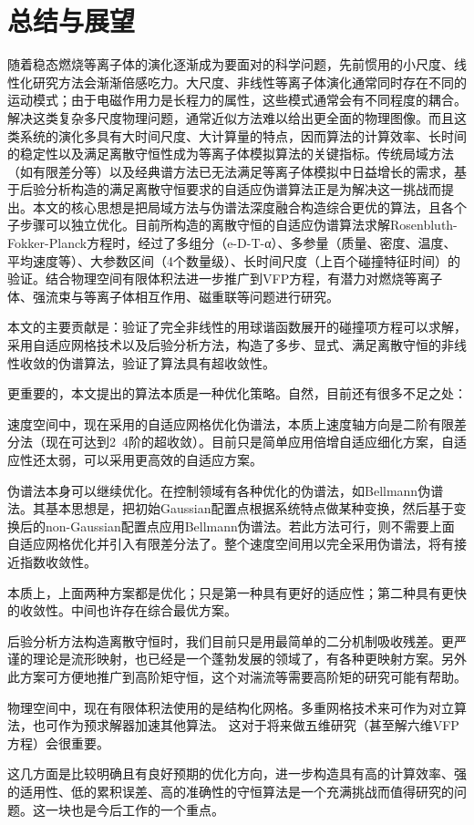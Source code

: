 \section{总结与展望}

随着稳态燃烧等离子体的演化逐渐成为要面对的科学问题，先前惯用的小尺度、线性化研究方法会渐渐倍感吃力。大尺度、非线性等离子体演化通常同时存在不同的运动模式；由于电磁作用力是长程力的属性，这些模式通常会有不同程度的耦合。解决这类复杂多尺度物理问题，通常近似方法难以给出更全面的物理图像。而且这类系统的演化多具有大时间尺度、大计算量的特点，因而算法的计算效率、长时间的稳定性以及满足离散守恒性成为等离子体模拟算法的关键指标。传统局域方法（如有限差分等）以及经典谱方法已无法满足等离子体模拟中日益增长的需求，基于后验分析构造的满足离散守恒要求的自适应伪谱算法正是为解决这一挑战而提出。本文的核心思想是把局域方法与伪谱法深度融合构造综合更优的算法，且各个子步骤可以独立优化。目前所构造的离散守恒的自适应伪谱算法求解Rosenbluth-Fokker-Planck方程时，经过了多组分（e-D-T-α）、多参量（质量、密度、温度、平均速度等）、大参数区间（4个数量级）、长时间尺度（上百个碰撞特征时间）的验证。结合物理空间有限体积法进一步推广到VFP方程，有潜力对燃烧等离子体、强流束与等离子体相互作用、磁重联等问题进行研究。

本文的主要贡献是：验证了完全非线性的用球谐函数展开的碰撞项方程可以求解，采用自适应网格技术以及后验分析方法，构造了多步、显式、满足离散守恒的非线性收敛的伪谱算法，验证了算法具有超收敛性。

更重要的，本文提出的算法本质是一种优化策略。自然，目前还有很多不足之处：

	速度空间中，现在采用的自适应网格优化伪谱法，本质上速度轴方向是二阶有限差分法（现在可达到2~4阶的超收敛）。目前只是简单应用倍增自适应细化方案，自适应性还太弱，可以采用更高效的自适应方案。
 
	伪谱法本身可以继续优化。在控制领域有各种优化的伪谱法，如Bellmann伪谱法。其基本思想是，把初始Gaussian配置点根据系统特点做某种变换，然后基于变换后的non-Gaussian配置点应用Bellmann伪谱法。若此方法可行，则不需要上面自适应网格优化并引入有限差分法了。整个速度空间用以完全采用伪谱法，将有接近指数收敛性。
 
本质上，上面两种方案都是优化；只是第一种具有更好的适应性；第二种具有更快的收敛性。中间也许存在综合最优方案。

	后验分析方法构造离散守恒时，我们目前只是用最简单的二分机制吸收残差。更严谨的理论是流形映射，也已经是一个蓬勃发展的领域了，有各种更映射方案。另外此方案可方便地推广到高阶矩守恒，这个对湍流等需要高阶矩的研究可能有帮助。
 
	物理空间中，现在有限体积法使用的是结构化网格。多重网格技术来可作为对立算法，也可作为预求解器加速其他算法。 这对于将来做五维研究（甚至解六维VFP方程）会很重要。
 
这几方面是比较明确且有良好预期的优化方向，进一步构造具有高的计算效率、强的适用性、低的累积误差、高的准确性的守恒算法是一个充满挑战而值得研究的问题。这一块也是今后工作的一个重点。

